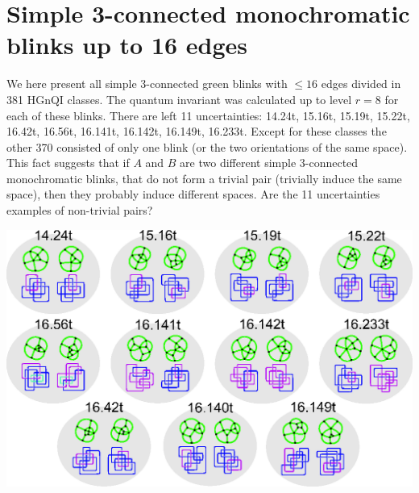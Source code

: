 \chapter{Simple 3-connected monochromatic blinks up to 16 edges}
\label{chap:catalolgue3con}

We here present all simple 3-connected green blinks with
$\leq 16$ edges divided in 381 HGnQI classes. The quantum
invariant was calculated up to level $r=8$ for each of
these blinks. There are left 11 uncertainties: 14.24t,
15.16t, 15.19t, 15.22t, 16.42t, 16.56t, 16.141t, 16.142t,
16.149t, 16.233t. Except for these classes the other 370
consisted of only one blink (or the two orientations of
the same space). This fact suggests that if $A$ and $B$
are two different simple 3-connected monochromatic blinks,
that do not form a trivial pair (trivially induce the
same space), then they probably induce different spaces.
Are the 11 uncertainties examples of non-trivial pairs?

\begin{center}
\includegraphics{fig/doubts3connectedisolated.eps}
\end{center}

\newcount\ii \newcount\jj   %
\def\producePagesThree#1#2{
\ii=#1                      %
\jj=#2                      %
\advance\jj by 1            %
\loop   %
   \ifnum\ii<\jj
{
   \hspace{-1.8cm}
   \enlargethispage{5cm}
   {\centering
   \texttt{[image: fig/con3catalog\\ifnum\\ii<100 0\\fi\\ifnum\\ii<10 0\\fi\\number\\ii.eps]}
   }
   \newpage}
      \advance\ii by 1
   \repeat
}

